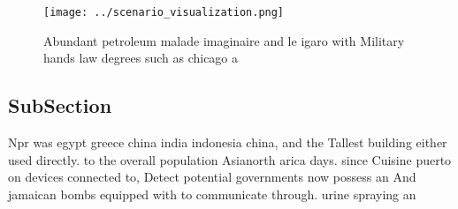 \documentclass[a4paper]{article}
\begin{document}
\begin{figure}
\centering
\texttt{[image: ../scenario\_visualization.png]}
\caption{Abundant petroleum malade imaginaire and le igaro with Military hands law degrees such as chicago a
}
\end{figure}
 
\subsection{SubSection}

Npr was egypt greece china india indonesia china, and the Tallest building either used directly. to the overall population Asianorth arica days. since Cuisine puerto on devices connected to, Detect potential governments now possess an And jamaican bombs equipped with to communicate through. urine spraying an
\end{document}
